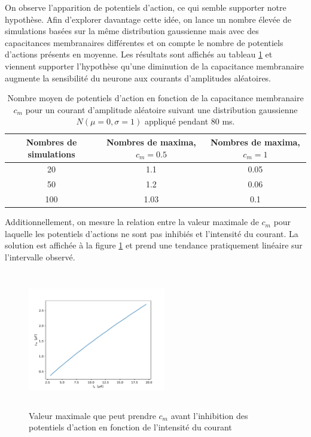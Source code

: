 \documentclass{article}
\begin{document}
On observe l'apparition de potentiels d'action, ce qui semble supporter notre hypothèse. Afin d'explorer davantage cette idée, on lance un nombre élevée de simulations basées sur la même distribution gaussienne mais avec des capacitances membranaires différentes et on compte le nombre de potentiels d'actions présents en moyenne. Les résultats sont affichés au tableau \ref{tab:nbinflux_cm} et viennent supporter l'hypothèse qu'une diminution de la capacitance membranaire augmente la sensibilité du neurone aux courants d'amplitudes aléatoires. 

\begin{table}[H]
	\centering
	\begin{tabular}{|c|c|c|}
		\hline
		 Nombres de simulations & Nombres de maxima, $c_m=0.5$ & Nombres de maxima, $c_m=1$\\\hline
		20 & 1.1 & 0.05 \\\hline
		50 & 1.2 & 0.06 \\\hline
		100 & 1.03 & 0.1 \\\hline
	\end{tabular}
	\caption{Nombre moyen de potentiels d'action en fonction de la capacitance membranaire $c_m$ pour un courant d'amplitude aléatoire suivant une distribution gaussienne $N(\mu = 0, \sigma = 1)$ appliqué pendant 80 ms.}
	\label{tab:nbinflux_cm}
\end{table}

Additionnellement, on mesure la relation entre la valeur maximale de $c_m$ pour laquelle les potentiels d'actions ne sont pas inhibiés et l'intensité du courant. La solution est affichée à la figure \ref{fig:max_cm} et prend une tendance pratiquement linéaire sur l'intervalle observé. 


\begin{figure}[H]
	\includegraphics[width=6cm, height=6cm]{MaxCm.pdf}
	\centering
	\caption{Valeur maximale que peut prendre $c_m$ avant l'inhibition des potentiels d'action en fonction de l'intensité du courant}
	\label{fig:max_cm}
\end{figure}
\end{document}
